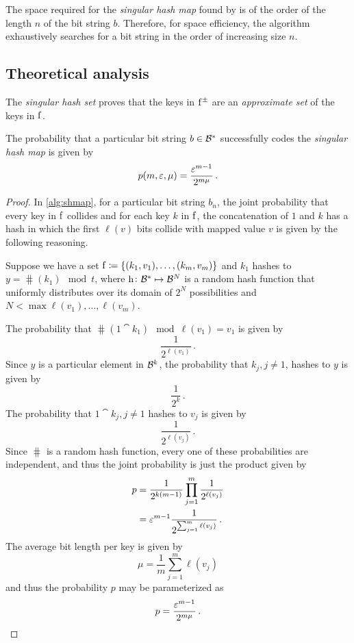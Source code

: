 \documentclass[11pt,final,hidelinks]{article}
\newcommand{\BL}{\ell}  %
\begin{document}
The space required for the \emph{singular hash map} found by  is of the order of the length $n$ of the bit string $b$. Therefore, for space efficiency, the algorithm exhaustively searches for a bit string in the order of increasing size $n$.

\subsection{Theoretical analysis}
The \emph{singular hash set} proves that the keys in $\APFun{f}$ are an \emph{approximate set} of the keys in $\Fun{f}$.

\begin{theorem}
The probability that a particular bit string $b \in \BitSet^*$ successfully codes the \emph{singular hash map} is given by
\begin{equation}
    p(m,\varepsilon,\mu) = \frac{\varepsilon^{m-1}}{2^{m \mu}}\,.
\end{equation}
\end{theorem}
\begin{proof}
In \cref{alg:shmap}, for a particular bit string $b_n$, the joint probability that every key in $\Fun{f}$ collides and for each key $k$ in $\Fun{f}$, the concatenation of $1$ and $k$ has a hash in which the first $\BL(v)$ bits collide with mapped value $v$ is given by the following reasoning.

Suppose we have a set $\Fun{f} \coloneqq \{(k_1,v_1),\ldots,(k_m,v_m)\}$ and $k_1$ hashes to $y = \hash(k_1) \mod t$, where $\hash \colon \BitSet^* \mapsto \BitSet^N$ is a random hash function that uniformly distributes over its domain of $2^N$ possibilities and $N < \max{\BL(v_1),\ldots,\BL(v_m)}$.

The probability that $\hash(1 \cat k_1) \mod \BL(v_1) = v_1$ is given by
\begin{equation}
    \frac{1}{2^{\BL(v_1)}}\,.
\end{equation}
Since $y$ is a particular element in $\BitSet^k$, the probability that $k_j, j \neq 1$, hashes to $y$ is given by
\begin{equation}
    \frac{1}{2^k}\,.
\end{equation}
The probability that $1 \cat k_j, j \neq 1$ hashes to $v_j$ is given by
\begin{equation}
    \frac{1}{2^{\BL(v_j)}}\,.
\end{equation}
Since $\hash$ is a random hash function, every one of these probabilities are independent, and thus the joint probability is just the product given by
\begin{align}
    p &= \frac{1}{2^{k(m-1)}} \prod_{j=1}^{m} \frac{1}{2^{\BL(v_j)}}\\
      &= \fprate^{m-1} \frac{1}{2^{\sum_{j=1}^{m} \BL(v_j)}}\,.
\end{align}
The average bit length per key is given by
\begin{equation}
    \mu = \frac{1}{m} \sum_{j=1}^{m} \BL(v_j)
\end{equation}
and thus the probability $p$ may be parameterized as
\begin{equation}
    p = \frac{\varepsilon^{m-1}}{2^{m \mu}}\,.
\end{equation}
\end{proof}
\end{document}
